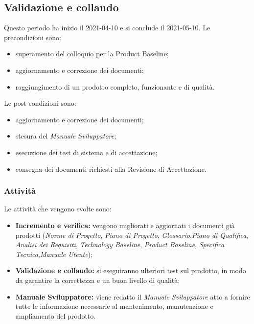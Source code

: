 \newpage
\subsection{Validazione e collaudo}
Questo periodo ha inizio il 2021-04-10 e si conclude il 2021-05-10.
Le precondizioni sono:
\begin{itemize}
	\item superamento del colloquio per la Product Baseline;
	\item aggiornamento e correzione dei documenti;
	\item raggiungimento di un prodotto completo, funzionante e di qualità.
\end{itemize}
Le post condizioni sono:
\begin{itemize}
	\item aggiornamento e correzione dei documenti;
	\item stesura del \textit{Manuale Sviluppatore};
	\item esecuzione dei test di sistema e di accettazione;
	\item consegna dei documenti richiesti alla Revisione di Accettazione.
\end{itemize}
\subsubsection{Attività}
Le attività che vengono svolte sono:
\begin{itemize}
	\item \textbf{Incremento e verifica:} vengono migliorati e aggiornati i documenti già prodotti (\textit{Norme di Progetto}, \textit{Piano di Progetto}, \textit{Glossario},\textit{Piano di Qualifica}, \textit{Analisi dei Requisiti}, \textit{Technology Baseline}, \textit{Product Baseline}, \textit{Specifica Tecnica},\textit{Manuale Utente});
	\item \textbf{Validazione e collaudo:} si eseguiranno ulteriori test sul prodotto, in modo da garantire la correttezza e un buon livello di qualità;
	\item \textbf{Manuale Sviluppatore:} viene redatto il \textit{Manuale Sviluppatore} atto a fornire tutte le informazione necessarie al mantenimento, manutenzione e ampliamento del prodotto.
\end{itemize}
